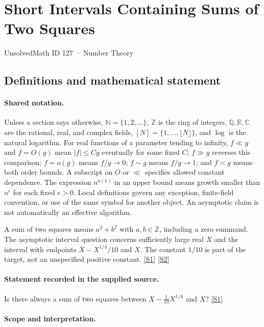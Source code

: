 \documentclass[11pt,a4paper]{article}
\newcommand{\N}{\mathbb{N}}
\newcommand{\Z}{\mathbb{Z}}
\newcommand{\Q}{\mathbb{Q}}
\newcommand{\R}{\mathbb{R}}
\newcommand{\C}{\mathbb{C}}
\newcommand{\sref}[2]{\hyperlink{source:#1:#2}{[S#2]}}
\begin{document}

\setcounter{section}{126}

\section{Short Intervals Containing Sums of Two Squares}\label{127}

{\small\sffamily UnsolvedMath ID 127 · Number Theory}

\subsection{Definitions and mathematical statement}

\paragraph{Shared notation.}Unless a section says otherwise, $\N=\{1,2,\ldots\}$,
$\Z$ is the ring of integers, $\Q,\R,\C$ are the rational, real, and complex
fields, $[N]=\{1,\ldots,\lfloor N\rfloor\}$, and $\log$ is the natural
logarithm. For real functions of a parameter tending to infinity,
$f\ll g$ and $f=O(g)$ mean $|f|\leq Cg$ eventually for some fixed $C$;
$f\gg g$ reverses this comparison; $f=o(g)$ means $f/g\to0$;
$f\sim g$ means $f/g\to1$; and $f\asymp g$ means both order bounds.
A subscript on $O$ or $\ll$ specifies allowed constant dependence.
The expression $n^{o(1)}$ in an upper bound means growth smaller than
$n^\epsilon$ for each fixed $\epsilon>0$. Local definitions govern any
exception, finite-field convention, or use of the same symbol for another
object. An asymptotic claim is not automatically an effective algorithm.



A sum of two squares means $a^2+b^2$ with $a,b\in\Z$, including a zero summand. The asymptotic interval question concerns sufficiently large real $X$ and the interval with endpoints $X-X^{1/4}/10$ and $X$. The constant $1/10$ is part of the target, not an unspecified positive constant. \sref{127}{1} \sref{127}{2}

\paragraph{Statement recorded in the supplied source.}
Is there always a sum of two squares between $X - \frac{1}{10}X^{1/4}$ and $X$? \sref{127}{1}

\paragraph{Scope and interpretation.}
\end{document}

